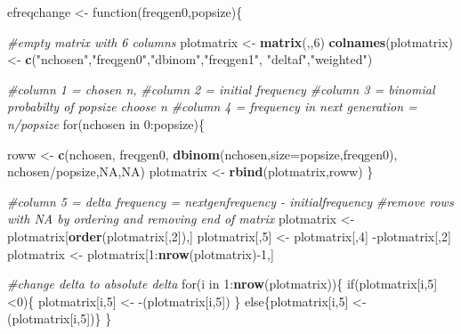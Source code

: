 \documentclass[]{article}
\newenvironment{Shaded}{\begin{snugshade}}{\end{snugshade}}
\newcommand{\KeywordTok}[1]{\textcolor[rgb]{0.13,0.29,0.53}{\textbf{{#1}}}}
\newcommand{\DataTypeTok}[1]{\textcolor[rgb]{0.13,0.29,0.53}{{#1}}}
\newcommand{\DecValTok}[1]{\textcolor[rgb]{0.00,0.00,0.81}{{#1}}}
\newcommand{\StringTok}[1]{\textcolor[rgb]{0.31,0.60,0.02}{{#1}}}
\newcommand{\CommentTok}[1]{\textcolor[rgb]{0.56,0.35,0.01}{\textit{{#1}}}}
\newcommand{\OtherTok}[1]{\textcolor[rgb]{0.56,0.35,0.01}{{#1}}}
\newcommand{\NormalTok}[1]{{#1}}
\begin{document}
\begin{Shaded}
\begin{Highlighting}[]
\NormalTok{efreqchange <-}\StringTok{ }\NormalTok{function(freqgen0,popsize)\{}
  
  \CommentTok{#empty matrix with 6 columns}
  \NormalTok{plotmatrix <-}\StringTok{ }\KeywordTok{matrix}\NormalTok{(,,}\DecValTok{6}\NormalTok{)                                 }
  \KeywordTok{colnames}\NormalTok{(plotmatrix) <-}\StringTok{ }\KeywordTok{c}\NormalTok{(}\StringTok{"nchosen"}\NormalTok{,}\StringTok{"freqgen0"}\NormalTok{,}\StringTok{"dbinom"}\NormalTok{,}\StringTok{"freqgen1"}\NormalTok{,}
                            \StringTok{"deltaf"}\NormalTok{,}\StringTok{"weighted"}\NormalTok{)}
  
  \CommentTok{#column 1 = chosen n, }
  \CommentTok{#column 2 = initial frequency}
  \CommentTok{#column 3 = binomial probabilty of popsize choose n}
  \CommentTok{#column 4 = frequency in next generation = n/popsize}
  \NormalTok{for(nchosen in }\DecValTok{0}\NormalTok{:popsize)\{}
      
    \NormalTok{roww <-}\StringTok{ }\KeywordTok{c}\NormalTok{(nchosen, freqgen0, }\KeywordTok{dbinom}\NormalTok{(nchosen,}\DataTypeTok{size=}\NormalTok{popsize,freqgen0),}
              \NormalTok{nchosen/popsize,}\OtherTok{NA}\NormalTok{,}\OtherTok{NA}\NormalTok{)}
    \NormalTok{plotmatrix <-}\StringTok{ }\KeywordTok{rbind}\NormalTok{(plotmatrix,roww)}
  \NormalTok{\}}
  
  \CommentTok{#column 5 = delta frequency = nextgenfrequency - initialfrequency}
  \CommentTok{#remove rows with NA by ordering and removing end of matrix}
  \NormalTok{plotmatrix <-}\StringTok{ }\NormalTok{plotmatrix[}\KeywordTok{order}\NormalTok{(plotmatrix[,}\DecValTok{2}\NormalTok{]),]}
  \NormalTok{plotmatrix[,}\DecValTok{5}\NormalTok{] <-}\StringTok{ }\NormalTok{plotmatrix[,}\DecValTok{4}\NormalTok{] -plotmatrix[,}\DecValTok{2}\NormalTok{]}
  \NormalTok{plotmatrix <-}\StringTok{ }\NormalTok{plotmatrix[}\DecValTok{1}\NormalTok{:}\KeywordTok{nrow}\NormalTok{(plotmatrix)-}\DecValTok{1}\NormalTok{,]}
  
  
  \CommentTok{#change delta to absolute delta}
  \NormalTok{for(i in }\DecValTok{1}\NormalTok{:}\KeywordTok{nrow}\NormalTok{(plotmatrix))\{}
    \NormalTok{if(plotmatrix[i,}\DecValTok{5}\NormalTok{]<}\DecValTok{0}\NormalTok{)\{}
      \NormalTok{plotmatrix[i,}\DecValTok{5}\NormalTok{] <-}\StringTok{ }\NormalTok{-(plotmatrix[i,}\DecValTok{5}\NormalTok{])}
    \NormalTok{\}}
    \NormalTok{else\{plotmatrix[i,}\DecValTok{5}\NormalTok{] <-}\StringTok{ }\NormalTok{(plotmatrix[i,}\DecValTok{5}\NormalTok{])\}}
  \NormalTok{\}}
  

\end{Highlighting}
\end{Shaded}
\end{document}
